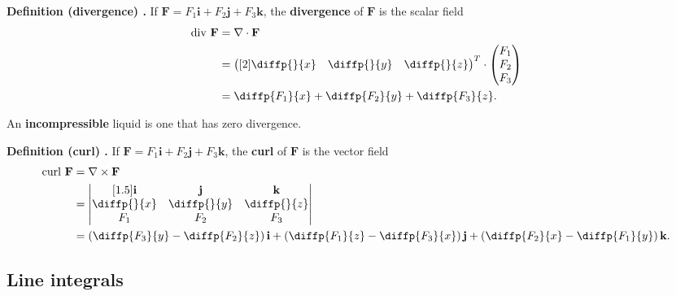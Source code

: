 \begin{shaded}
\textbf{Definition (divergence) \cite{math2111_notes}.} If $\mathbf{F} = F_1 \mathbf{i} + F_2 \mathbf{j} + F_3 \mathbf{k}$, the \textbf{divergence} of $\mathbf{F}$ is the scalar field
\begin{align*}
\text{div} \ \mathbf{F} &= \nabla \cdot \mathbf{F} \\
&= \begin{pmatrix}[2] \diffp{}{x} & \diffp{}{y} & \diffp{}{z} \end{pmatrix}^{T}
\cdot \begin{pmatrix} F_1 \\ F_2 \\ F_3 \end{pmatrix} \\
&= \diffp{F_1}{x} + \diffp{F_2}{y} + \diffp{F_3}{z} .
\end{align*}
\end{shaded}

An \textbf{incompressible} liquid is one that has zero divergence.

\begin{shaded}
\textbf{Definition (curl) \cite{math2111_notes}.} If $\mathbf{F} = F_1 \mathbf{i} + F_2 \mathbf{j} + F_3 \mathbf{k}$, the \textbf{curl} of $\mathbf{F}$ is the vector field
\begin{align*}
\text{curl} \ \mathbf{F} &= \nabla \times \mathbf{F} \\
&= \begin{vmatrix}[1.5]
	\mathbf{i} & \mathbf{j} & \mathbf{k} \\
	\diffp{}{x} & \diffp{}{y} & \diffp{}{z} \\
	F_1 & F_2 & F_3
\end{vmatrix} \\
&= \left( \diffp{F_3}{y} - \diffp{F_2}{z} \right) \mathbf{i} + \left( \diffp{F_1}{z} - \diffp{F_3}{x} \right) \mathbf{j} + \left( \diffp{F_2}{x} - \diffp{F_1}{y} \right) \mathbf{k} .
\end{align*}
\end{shaded}

\subsection{Line integrals}

